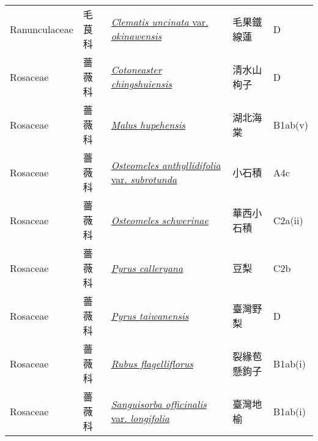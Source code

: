 {\begin{longtable}{p{2.5cm}p{2.5cm}p{4.5cm}p{2.5cm}p{3cm}}
    Ranunculaceae & 毛茛科 & \href{http://www.theplantlist.org/tpl1.1/search?q=Clematis+uncinata+var.+okinawensis}{\textit{Clematis uncinata} var. \textit{okinawensis} } & 毛果鐵線蓮 & D \index{Clematis@\textit{Clematis}!uncinata@\textit{uncinata}!var. okinawensis@var. \textit{okinawensis}}  \index{毛果鐵線蓮} \\
    Rosaceae & 薔薇科 & \href{http://www.theplantlist.org/tpl1.1/search?q=Cotoneaster+chingshuiensis}{\textit{Cotoneaster chingshuiensis} } & 清水山栒子 & D \index{Cotoneaster@\textit{Cotoneaster}!chingshuiensis@\textit{chingshuiensis}}  \index{清水山栒子} \\
    Rosaceae & 薔薇科 & \href{http://www.theplantlist.org/tpl1.1/search?q=Malus+hupehensis}{\textit{Malus hupehensis} } & 湖北海棠 & B1ab(v) \index{Malus@\textit{Malus}!hupehensis@\textit{hupehensis}}  \index{湖北海棠} \\
    Rosaceae & 薔薇科 & \href{http://www.theplantlist.org/tpl1.1/search?q=Osteomeles+anthyllidifolia+var.+subrotunda}{\textit{Osteomeles anthyllidifolia} var. \textit{subrotunda} } & 小石積 & A4c \index{Osteomeles@\textit{Osteomeles}!anthyllidifolia@\textit{anthyllidifolia}!var. subrotunda@var. \textit{subrotunda}}  \index{小石積} \\
    Rosaceae & 薔薇科 & \href{http://www.theplantlist.org/tpl1.1/search?q=Osteomeles+schwerinae}{\textit{Osteomeles schwerinae} } & 華西小石積 & C2a(ii) \index{Osteomeles@\textit{Osteomeles}!schwerinae@\textit{schwerinae}}  \index{華西小石積} \\
    Rosaceae & 薔薇科 & \href{http://www.theplantlist.org/tpl1.1/search?q=Pyrus+calleryana}{\textit{Pyrus calleryana} } & 豆梨 & C2b \index{Pyrus@\textit{Pyrus}!calleryana@\textit{calleryana}}  \index{豆梨} \\
    Rosaceae & 薔薇科 & \href{http://www.theplantlist.org/tpl1.1/search?q=Pyrus+taiwanensis}{\textit{Pyrus taiwanensis} } & 臺灣野梨 & D \index{Pyrus@\textit{Pyrus}!taiwanensis@\textit{taiwanensis}}  \index{臺灣野梨} \\
    Rosaceae & 薔薇科 & \href{http://www.theplantlist.org/tpl1.1/search?q=Rubus+flagelliflorus}{\textit{Rubus flagelliflorus} } & 裂緣苞懸鉤子 & B1ab(i) \index{Rubus@\textit{Rubus}!flagelliflorus@\textit{flagelliflorus}}  \index{裂緣苞懸鉤子} \\
    Rosaceae & 薔薇科 & \href{http://www.theplantlist.org/tpl1.1/search?q=Sanguisorba+officinalis+var.+longifolia}{\textit{Sanguisorba officinalis} var. \textit{longifolia} } & 臺灣地榆 & B1ab(i) \index{Sanguisorba@\textit{Sanguisorba}!officinalis@\textit{officinalis}!var. longifolia@var. \textit{longifolia}}  \index{臺灣地榆} \\

\end{longtable}}
